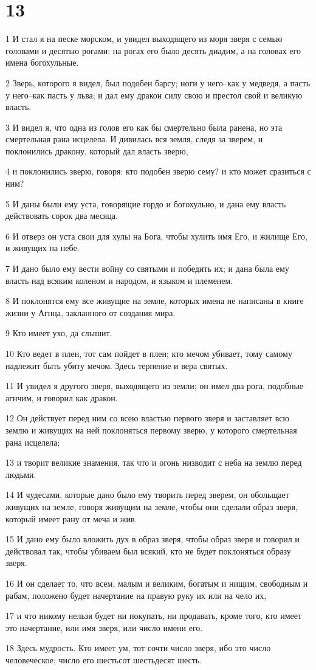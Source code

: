 \chapter{13}

\par 1 И стал я на песке морском, и увидел выходящего из моря зверя с семью головами и десятью рогами: на рогах его было десять диадим, а на головах его имена богохульные.
\par 2 Зверь, которого я видел, был подобен барсу; ноги у него--как у медведя, а пасть у него--как пасть у льва; и дал ему дракон силу свою и престол свой и великую власть.
\par 3 И видел я, что одна из голов его как бы смертельно была ранена, но эта смертельная рана исцелела. И дивилась вся земля, следя за зверем, и поклонились дракону, который дал власть зверю,
\par 4 и поклонились зверю, говоря: кто подобен зверю сему? и кто может сразиться с ним?
\par 5 И даны были ему уста, говорящие гордо и богохульно, и дана ему власть действовать сорок два месяца.
\par 6 И отверз он уста свои для хулы на Бога, чтобы хулить имя Его, и жилище Его, и живущих на небе.
\par 7 И дано было ему вести войну со святыми и победить их; и дана была ему власть над всяким коленом и народом, и языком и племенем.
\par 8 И поклонятся ему все живущие на земле, которых имена не написаны в книге жизни у Агнца, закланного от создания мира.
\par 9 Кто имеет ухо, да слышит.
\par 10 Кто ведет в плен, тот сам пойдет в плен; кто мечом убивает, тому самому надлежит быть убиту мечом. Здесь терпение и вера святых.
\par 11 И увидел я другого зверя, выходящего из земли; он имел два рога, подобные агнчим, и говорил как дракон.
\par 12 Он действует перед ним со всею властью первого зверя и заставляет всю землю и живущих на ней поклоняться первому зверю, у которого смертельная рана исцелела;
\par 13 и творит великие знамения, так что и огонь низводит с неба на землю перед людьми.
\par 14 И чудесами, которые дано было ему творить перед зверем, он обольщает живущих на земле, говоря живущим на земле, чтобы они сделали образ зверя, который имеет рану от меча и жив.
\par 15 И дано ему было вложить дух в образ зверя, чтобы образ зверя и говорил и действовал так, чтобы убиваем был всякий, кто не будет поклоняться образу зверя.
\par 16 И он сделает то, что всем, малым и великим, богатым и нищим, свободным и рабам, положено будет начертание на правую руку их или на чело их,
\par 17 и что никому нельзя будет ни покупать, ни продавать, кроме того, кто имеет это начертание, или имя зверя, или число имени его.
\par 18 Здесь мудрость. Кто имеет ум, тот сочти число зверя, ибо это число человеческое; число его шестьсот шестьдесят шесть.

